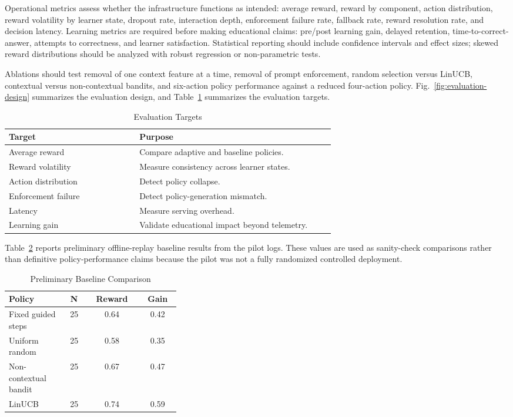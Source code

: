 \documentclass[conference]{IEEEtran}
\begin{document}
Operational metrics assess whether the infrastructure functions as intended: average reward, reward by component, action distribution, reward volatility by learner state, dropout rate, interaction depth, enforcement failure rate, fallback rate, reward resolution rate, and decision latency. Learning metrics are required before making educational claims: pre/post learning gain, delayed retention, time-to-correct-answer, attempts to correctness, and learner satisfaction. Statistical reporting should include confidence intervals and effect sizes; skewed reward distributions should be analyzed with robust regression or non-parametric tests.

Ablations should test removal of one context feature at a time, removal of prompt enforcement, random selection versus LinUCB, contextual versus non-contextual bandits, and six-action policy performance against a reduced four-action policy. Fig.~\ref{fig:evaluation-design} summarizes the evaluation design, and Table~\ref{tab:evaluation-targets} summarizes the evaluation targets.

\begin{table}[htbp]
\caption{Evaluation Targets}
\label{tab:evaluation-targets}
\centering
\begin{tabular}{p{0.36\linewidth}p{0.54\linewidth}}
\toprule
\textbf{Target} & \textbf{Purpose} \\
\midrule
Average reward & Compare adaptive and baseline policies. \\
Reward volatility & Measure consistency across learner states. \\
Action distribution & Detect policy collapse. \\
Enforcement failure & Detect policy-generation mismatch. \\
Latency & Measure serving overhead. \\
Learning gain & Validate educational impact beyond telemetry. \\
\bottomrule
\end{tabular}
\end{table}

Table~\ref{tab:baseline-results} reports preliminary offline-replay baseline results from the pilot logs. These values are used as sanity-check comparisons rather than definitive policy-performance claims because the pilot was not a fully randomized controlled deployment.

\begin{table}[htbp]
\caption{Preliminary Baseline Comparison}
\label{tab:baseline-results}
\centering
\begin{tabular}{p{0.34\linewidth}ccc}
\toprule
\textbf{Policy} & \textbf{N} & \textbf{Reward} & \textbf{Gain} \\
\midrule
Fixed guided steps & 25 & 0.64 & 0.42 \\
Uniform random & 25 & 0.58 & 0.35 \\
Non-contextual bandit & 25 & 0.67 & 0.47 \\
LinUCB & 25 & 0.74 & 0.59 \\
\bottomrule
\end{tabular}
\end{table}
\end{document}

